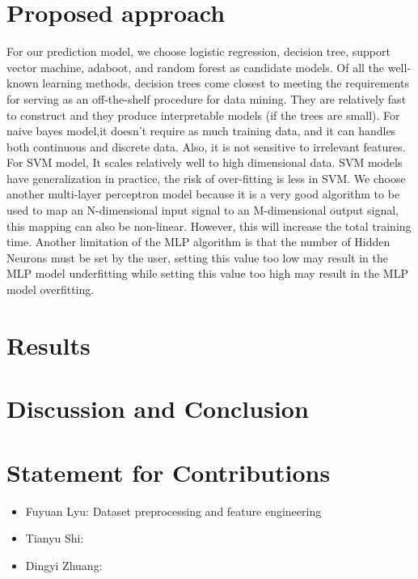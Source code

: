 \documentclass[11pt]{scrartcl}
\begin{document}
\section{Proposed approach}
For our prediction model, we choose logistic regression, decision tree, support vector machine, adaboot, and random forest as candidate models. Of all the well-known learning methods, decision trees come closest to meeting the requirements for serving as an off-the-shelf procedure for data mining. They are relatively fast to construct and they produce interpretable models (if the trees are small). For naive bayes model,it doesn’t require as much training data, and it can handles both continuous and discrete data. Also, it is not sensitive to irrelevant features. For SVM model, It scales relatively well to high dimensional data. SVM models have generalization in practice, the risk of over-fitting is less in SVM. We choose another multi-layer perceptron  model because it is a very good algorithm to be used to map an N-dimensional input signal to an M-dimensional output signal, this mapping can also be non-linear.  However, this will increase the total training time. Another limitation of the MLP algorithm is that the number of Hidden Neurons must be set by the user, setting this value too low may result in the MLP model underfitting while setting this value too high may result in the MLP model overfitting. 




\section{Results}

\section{Discussion and Conclusion}

\section{Statement for Contributions}
\begin{itemize}
	\item Fuyuan Lyu: Dataset preprocessing and feature engineering
	\item Tianyu Shi:
	\item Dingyi Zhuang:
\end{itemize}



\end{document}
